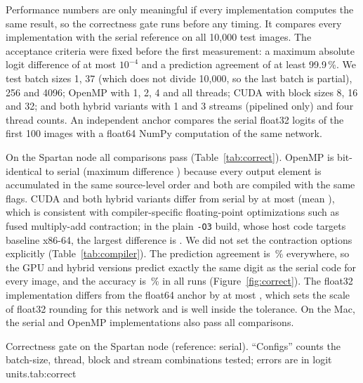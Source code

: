 Performance numbers are only meaningful if every implementation computes the same result, so the correctness gate runs before any timing. It compares every implementation with the serial reference on all 10{,}000 test images. The acceptance criteria were fixed before the first measurement: a maximum absolute logit difference of at most $10^{-4}$ and a prediction agreement of at least 99.9\,\%. We test batch sizes 1, 37 (which does not divide 10{,}000, so the last batch is partial), 256 and 4096; OpenMP with 1, 2, 4 and all threads; CUDA with block sizes 8, 16 and 32; and both hybrid variants with 1 and 3 streams (pipelined only) and four thread counts. An independent anchor compares the serial float32 logits of the first 100 images with a float64 NumPy computation of the same network.

On the Spartan node all  comparisons pass (Table~\ref{tab:correct}). OpenMP is bit-identical to serial (maximum difference ) because every output element is accumulated in the same source-level order and both are compiled with the same flags. CUDA and both hybrid variants differ from serial by at most  (mean ), which is consistent with compiler-specific floating-point optimizations such as fused multiply-add contraction; in the plain \texttt{-O3} build, whose host code targets baseline x86-64, the largest difference is . We did not set the contraction options explicitly (Table~\ref{tab:compiler}). The prediction agreement is \,\% everywhere, so the GPU and hybrid versions predict exactly the same digit as the serial code for every image, and the accuracy is \,\% in all runs (Figure~\ref{fig:correct}). The float32 implementation differs from the float64 anchor by at most , which sets the scale of float32 rounding for this network and is well inside the tolerance. On the Mac, the serial and OpenMP implementations also pass all  comparisons.

\begin{widetable}{Correctness gate on the Spartan node (reference: serial). ``Configs'' counts the batch-size, thread, block and stream combinations tested; errors are in logit units.}{tab:correct}

\end{widetable}

